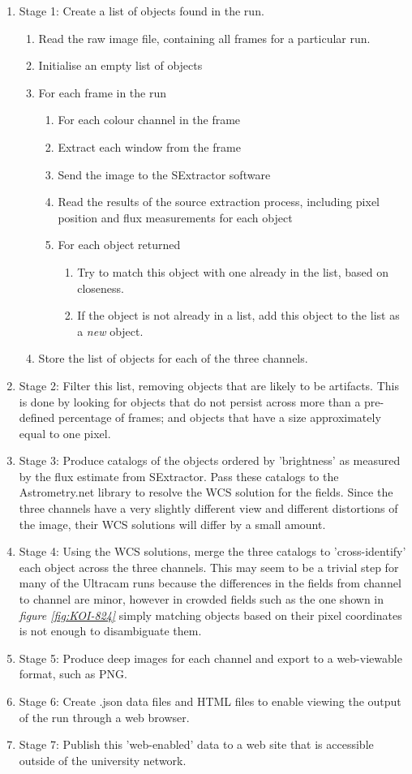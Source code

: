 \documentclass[a4paper,10pt]{article}
\begin{document}
\begin{enumerate}
	\item Stage 1: Create a list of objects found in the run. 
	\begin{enumerate}
		\item Read the raw image file, containing all frames for a particular run.
		\item Initialise an empty list of objects
		\item For each frame in the run
		\begin{enumerate}
			\item For each colour channel in the frame
			\item Extract each window from the frame
			\item Send the image to the SExtractor software
			\item Read the results of the source extraction process, including pixel position and flux measurements for each object
			\item For each object returned
			\begin{enumerate} 
				\item Try to match this object with one already in the list, based on closeness.
				\item If the object is not already in a list, add this object to the list as a \emph{new} object.
			\end{enumerate}
		\end{enumerate}
		\item Store the list of objects for each of the three channels.
	\end{enumerate}
	\item Stage 2: Filter this list, removing objects that are likely to be artifacts. This is done by looking for objects that do not persist across more than a pre-defined percentage of frames; and objects that have a size approximately equal to one pixel. 
	\item Stage 3: Produce catalogs of the objects ordered by 'brightness' as measured by the flux estimate from SExtractor. Pass these catalogs to the Astrometry.net library to resolve the WCS solution for the fields. Since the three channels have a very slightly different view and different distortions of the image, their WCS solutions will differ by a small amount.
	\item Stage 4: Using the WCS solutions, merge the three catalogs to 'cross-identify' each object across the three channels. This may seem to be a trivial step for many of the Ultracam runs because the differences in the fields from channel to channel are minor, however in crowded fields such as the one shown in \emph{figure \ref{fig:KOI-824}} simply matching objects based on their pixel coordinates is not enough to disambiguate them.
	\item Stage 5: Produce deep images for each channel and export to a web-viewable format, such as PNG. 
	\item Stage 6: Create .json data files and HTML files to enable viewing the output of the run through a web browser. 
	\item Stage 7: Publish this 'web-enabled' data to a web site that is accessible outside of the university network.  
		

\end{enumerate}
\end{document}
